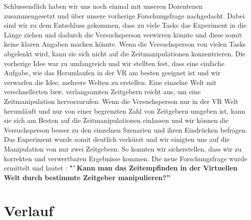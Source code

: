 \documentclass{Bericht}
\begin{document}
	Schlussendlich haben wir uns noch einmal mit unseren Dozentenen zusammengesetzt und über unsere vorherige Forschungsfrage nachgedacht. Dabei sind wir zu dem Entschluss gekommen, dass zu viele Tasks das Experiment in die Länge ziehen und dadurch die Versuchsperson verwirren könnte und diese somit keine klaren Angaben machen könnte. Wenn die Versuchsperson von vielen Tasks abgelenkt wird, kann sie sich nicht auf die Zeitmanipulationen konzentrieren. Die vorherige Idee war zu umfangreich und wir stellten fest, dass eine einfache Aufgabe, wie das Herumlaufen in der VR am besten geeignet ist und wir verwarfen die Idee, mehrere Welten zu erstellen. Eine einzelne Welt mit verschnellerten bzw. verlangsamten Zeitgebern reicht aus, um eine Zeitmanipulation hervorzurufen. Wenn die Versuchsperson nur in der VR Welt herumläuft und nur von einer begrenzten Zahl von Zeitgebern umgeben ist, kann sie sich am Besten auf die Zeitmanipulationen einlassen und wir können die Versuchsperson besser zu den einzelnen Szenarien und ihren Eindrücken befragen. 
 Das Experiment wurde somit deutlich verkürzt und wir einigten uns auf die Manipulation von nur zwei Zeitgebern. So konnten wir sicherstellen, dass wir zu korrekten und verwertbaren Ergebnisse kommen. Die neue Forschungsfrage wurde ermittelt und lautet : \textbf{"`Kann man das Zeitempfinden in der Virtuellen Welt durch bestimmte Zeitgeber manipulieren?''}

\section{Verlauf} %
\end{document}
